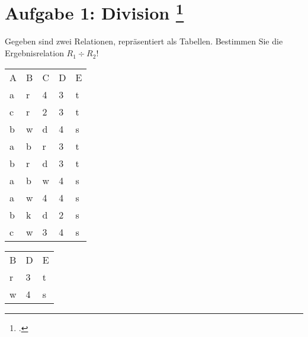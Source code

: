 \documentclass{lehramt-informatik-aufgabe}
\begin{document}
\def\r#1{\textcolor{red}{#1}}
\def\g#1{\textcolor{green}{#1}}
\def\o#1{\textcolor{orange}{#1}}
\def\b#1{\textcolor{blue}{#1}}


\section{Aufgabe 1: Division
\footcite[Aufgabe 1]{db:ab:4}}

Gegeben sind zwei Relationen, repräsentiert als Tabellen. Bestimmen Sie
die Ergebnisrelation $R_1 \div R_2$!
\begin{multicols}{2}


\begin{tabular}{lllll}
A & B & C & D & E \\
a & r & 4 & 3 & t \\
c & r & 2 & 3 & t \\%
b & w & d & 4 & s \\
a & b & r & 3 & t \\
b & r & d & 3 & t \\
a & b & w & 4 & s \\
a & w & 4 & 4 & s \\%
b & k & d & 2 & s \\
c & w & 3 & 4 & s
\end{tabular}


\begin{tabular}{lll}
B & D & E \\
r & 3 & t \\
w & 4 & s
\end{tabular}
\end{multicols}
\end{document}
